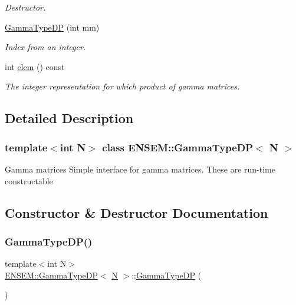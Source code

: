 \begin{DoxyCompactItemize}
\begin{DoxyCompactList}\small\item\em Destructor. \end{DoxyCompactList}\item 
\mbox{\hyperlink{classENSEM_1_1GammaTypeDP_a6a31946a6e7bde24f7bae87f6cfd2add}{Gamma\+Type\+DP}} (int mm)
\begin{DoxyCompactList}\small\item\em Index from an integer. \end{DoxyCompactList}\item 
int \mbox{\hyperlink{classENSEM_1_1GammaTypeDP_a0d7ad0581feda4578c3ee7631ce730e2}{elem}} () const
\begin{DoxyCompactList}\small\item\em The integer representation for which product of gamma matrices. \end{DoxyCompactList}\end{DoxyCompactItemize}


\subsection{Detailed Description}
\subsubsection*{template$<$int N$>$\newline
class E\+N\+S\+E\+M\+::\+Gamma\+Type\+D\+P$<$ N $>$}

Gamma matrices Simple interface for gamma matrices. These are run-\/time constructable 

\subsection{Constructor \& Destructor Documentation}
\mbox{\label{classENSEM_1_1GammaTypeDP_a1833bb262c5e172a0463d853c76c1d18}} 
\subsubsection{\texorpdfstring{GammaTypeDP()}{GammaTypeDP()}\hspace{0.1cm}{\footnotesize\ttfamily [1/4]}}
{\footnotesize\ttfamily template$<$int N$>$ \\
\mbox{\hyperlink{classENSEM_1_1GammaTypeDP}{E\+N\+S\+E\+M\+::\+Gamma\+Type\+DP}}$<$ \mbox{\hyperlink{operator__name__util_8cc_a7722c8ecbb62d99aee7ce68b1752f337}{N}} $>$\+::\mbox{\hyperlink{classENSEM_1_1GammaTypeDP}{Gamma\+Type\+DP}} (\begin{DoxyParamCaption}{ }\end{DoxyParamCaption})\hspace{0.3cm}{\ttfamily [inline]}}



